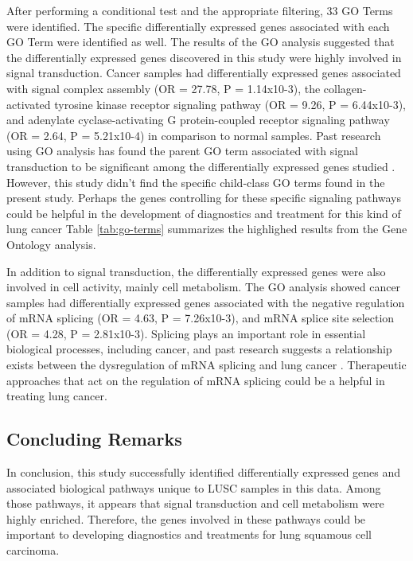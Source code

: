 \documentclass[9pt,twocolumn,twoside]{gsajnl}
\begin{document}
After performing a conditional test and the appropriate filtering, 33 GO Terms were identified. The specific differentially expressed genes associated with each GO Term were identified as well. The results of the GO analysis suggested that the differentially expressed genes discovered in this study were highly involved in signal transduction. Cancer samples had differentially expressed genes associated with signal complex assembly (OR = 27.78, P = 1.14x10-3), the collagen-activated tyrosine kinase receptor signaling pathway (OR = 9.26, P = 6.44x10-3), and adenylate cyclase-activating G protein-coupled receptor signaling pathway (OR = 2.64, P = 5.21x10-4) in comparison to normal samples. Past research using GO analysis has found the parent GO term associated with signal transduction to be significant among the differentially expressed genes studied \citep{long2019identification}. However, this study didn't find the specific child-class GO terms found in the present study. Perhaps the genes controlling for these specific signaling pathways could be helpful in the development of diagnostics and treatment for this kind of lung cancer Table \ref{tab:go-terms} summarizes the highlighed results from the Gene Ontology analysis.

In addition to signal transduction, the differentially expressed genes were also involved in cell activity, mainly cell metabolism. The GO analysis showed cancer samples had differentially expressed genes associated with the negative regulation of mRNA splicing (OR = 4.63, P = 7.26x10-3), and mRNA splice site selection (OR = 4.28, P = 2.81x10-3). Splicing plays an important role in essential biological processes, including cancer, and past research suggests a relationship exists between the dysregulation of mRNA splicing and lung cancer \citep{altsplicing}. Therapeutic approaches that act on the regulation of mRNA splicing could be a helpful in treating lung cancer.

\subsection{Concluding Remarks}

In conclusion, this study successfully identified differentially expressed genes and associated biological pathways unique to LUSC samples in this data. Among those pathways, it appears that signal transduction and cell metabolism were highly enriched. Therefore, the genes involved in these pathways could be important to developing diagnostics and treatments for lung squamous cell carcinoma. 
\end{document}
